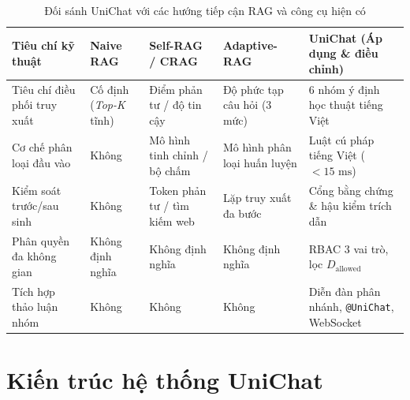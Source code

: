 \documentclass{IEEEtran}
\begin{document}
\begin{table}[t]
\caption{Đối sánh UniChat với các hướng tiếp cận RAG và công cụ hiện có}
\label{tab:related_work_comparison}
\centering
\scriptsize
\setlength{\tabcolsep}{2.5pt}
\begin{tabularx}{\columnwidth}{|L{2.05cm}|C{1.15cm}|C{1.15cm}|C{1.25cm}|Y|}
\hline
\textbf{Tiêu chí kỹ thuật} & \textbf{Naive RAG \cite{lewis2020rag}} & \textbf{Self-RAG \cite{asai2024selfrag} / CRAG \cite{yan2024crag}} & \textbf{Adaptive-RAG \cite{jeong2024adaptiverag}} & \textbf{UniChat (Áp dụng \& điều chỉnh)} \\
\hline
Tiêu chí điều phối truy xuất & Cố định (\textit{Top-K} tĩnh) & Điểm phản tư / độ tin cậy & Độ phức tạp câu hỏi (3 mức) & 6 nhóm ý định học thuật tiếng Việt \\
\hline
Cơ chế phân loại đầu vào & Không & Mô hình tinh chỉnh / bộ chấm & Mô hình phân loại huấn luyện & Luật cú pháp tiếng Việt ($<15\text{~ms}$) \\
\hline
Kiểm soát trước/sau sinh & Không & Token phản tư / tìm kiếm web & Lặp truy xuất đa bước & Cổng bằng chứng \& hậu kiểm trích dẫn \\
\hline
Phân quyền đa không gian & Không định nghĩa & Không định nghĩa & Không định nghĩa & RBAC 3 vai trò, lọc $D_{\text{allowed}}$ \\
\hline
Tích hợp thảo luận nhóm & Không & Không & Không & Diễn đàn phân nhánh, \texttt{@UniChat}, WebSocket \\
\hline
\end{tabularx}
\end{table}

\section{Kiến trúc hệ thống UniChat}
\label{sec:system_architecture}
\end{document}
